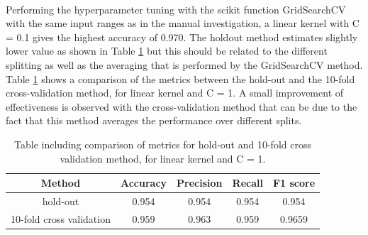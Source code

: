 \documentclass{article}
\begin{document}
\\Performing the hyperparameter tuning with the scikit function GridSearchCV with the same input ranges as in the manual investigation, a linear kernel with C = 0.1 gives the highest accuracy of 0.970. The holdout method estimates slightly lower value as shown in Table \ref{table:votings_SVM_cross} but this should be related to the different splitting as well as the averaging that is performed by the GridSearchCV method.
\\ Table \ref{table:votings_SVM_cross} shows a comparison of the metrics between the hold-out and the 10-fold cross-validation method, for linear kernel and C = 1. A small improvement of effectiveness is observed with the cross-validation method that can be due to the fact that this method averages the performance over different splits. 
\begin{table}[h!]
\centering
\begin{tabular}{||c c c c c||} 
 \hline
Method &  Accuracy & Precision & Recall & F1 score \\ [0.5ex] 
 \hline\hline
hold-out & 0.954 & 0.954 & 0.954 & 0.954  \\  
 10-fold cross validation &  0.959&  0.963 &  0.959& 0.9659 \\ [1ex] 
 \hline
\end{tabular}
\caption{Table including comparison of metrics for hold-out and 10-fold cross validation method, for linear kernel and C = 1.}
\label{table:votings_SVM_cross}
\end{table}
\end{document}
